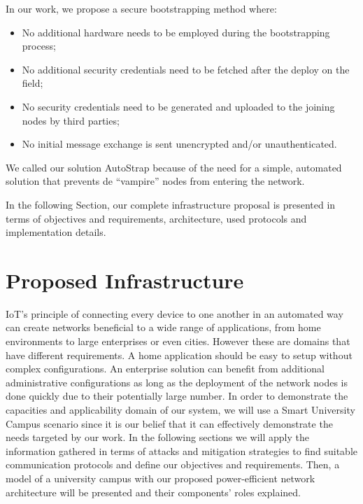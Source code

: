 \documentclass{sig-alternate-05-2015}
\begin{document}
In our work, we propose a secure bootstrapping method where:
\begin{itemize}
	\item No additional hardware needs to be employed during the bootstrapping process;
	\item No additional security credentials need to be fetched after the deploy on the field;
	\item No security credentials need to be generated and uploaded to the joining nodes by third parties;
	\item No initial message exchange is sent unencrypted and/or unauthenticated.
\end{itemize}

We called our solution AutoStrap because of the need for a simple, automated solution that prevents de ``vampire'' nodes from entering the network.

In the following Section, our complete infrastructure proposal is presented in terms of objectives and requirements, architecture, used protocols and implementation details. 

\section{Proposed Infrastructure}
\label{sec:proposed_infrastructure}
\gls{IoT}'s principle of connecting every device to one another in an automated way can create networks beneficial to a wide range of applications, from home environments to large enterprises or even cities. 
However these are domains that have different requirements. 
A home application should be easy to setup without complex configurations. 
An enterprise solution can benefit from additional administrative configurations as long as the deployment of the network nodes is done quickly due to their potentially large number. 
In order to demonstrate the capacities and applicability domain of our system, we will use a Smart University Campus scenario since it is our belief that it can effectively demonstrate the needs targeted by our work.
In the following sections we will apply the information gathered in terms of attacks and mitigation strategies to find suitable communication protocols and define our objectives and requirements. 
Then, a model of a university campus with our proposed power-efficient network architecture will be presented and their components' roles explained.
\end{document}
